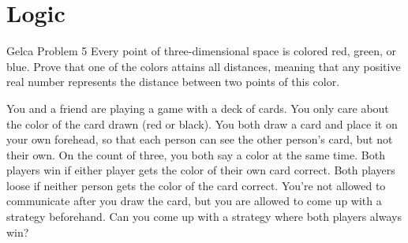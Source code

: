 \section{Logic}
\begin{boxProblem}{Gelca Problem 5}
    Every point of three-dimensional space is colored red, green, or blue.
    Prove that one of the colors attains all distances, meaning that any positive real number represents the distance between two points of this color.
\end{boxProblem}
\begin{boxProblem}{}
    You and a friend are playing a game with a deck of cards.
    You only care about the color of the card drawn (red or black).
    You both draw a card and place it on your own forehead,
        so that each person can see the other person's card,
        but not their own.
    On the count of three,
        you both say a color at the same time.
    Both players win if either player gets the color of their own card correct.
    Both players loose if neither person gets the color of the card correct.
    You're not allowed to communicate after you draw the card,
        but you are allowed to come up with a strategy beforehand.
    Can you come up with a strategy where both players always win?
\end{boxProblem}


